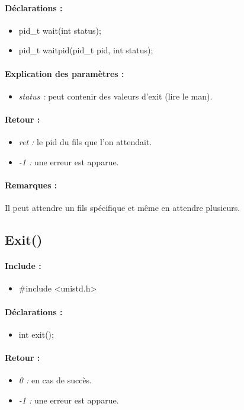 \documentclass{article}[12pt]
\begin{document}
\paragraph{Déclarations : }
\begin{itemize}
	\item pid\_t wait(int \* status);
    \item pid\_t waitpid(pid\_t pid, int \* status);
\end{itemize}
\paragraph{Explication des paramètres : }
\begin{itemize}
	\item \emph{status : } peut contenir des valeurs d'exit (lire le man).
\end{itemize}
\paragraph{Retour : }
\begin{itemize}
	\item \emph{ret : } le pid du fils que l'on attendait.
	\item \emph{-1 : } une erreur est apparue.
\end{itemize}
\paragraph{Remarques : }
Il peut attendre un fils spécifique et même en attendre plusieurs.
\subsection{Exit()}
\paragraph{Include : }
\begin{itemize}
	\item \#include <unistd.h>
\end{itemize}
\paragraph{Déclarations : }
\begin{itemize}
	\item int exit();
\end{itemize}
\paragraph{Retour : }
\begin{itemize}
	\item \emph{0 : } en cas de succès.
	\item \emph{-1 : } une erreur est apparue.
\end{itemize}
\end{document}
